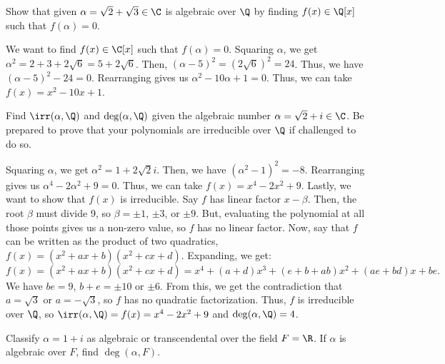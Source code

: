 
\begin{problem}[39.2]
  Show that given $\alpha = \sqrt{2} + \sqrt{3} \in \C$ is algebraic over $\Q$ by finding $f(x) \in \Q[x]$ such that $f(\alpha) = 0$.
\end{problem}

\begin{solution}
  We want to find $f(x) \in \C[x]$ such that $f(\alpha) = 0$. Squaring $\alpha$, we get $\alpha^2 = 2 + 3 + 2\sqrt{6} = 5 + 2\sqrt{6}$. Then, $(\alpha - 5)^2 = (2\sqrt{6})^2 = 24$. Thus, we have $(\alpha - 5)^2 - 24 = 0$. Rearranging gives us $\alpha^2 - 10\alpha + 1 = 0$. Thus, we can take $f(x) = x^2 - 10x + 1$.
\end{solution}

\begin{problem}[39.8]
  Find $\irr(\alpha, \Q)$ and $\deg(\alpha, \Q)$ given the algebraic number $\alpha = \sqrt{2} + i \in \C$. Be prepared to prove that your polynomials are irreducible over $\Q$ if challenged to do so.
\end{problem}

\begin{solution}
  Squaring $\alpha$, we get $\alpha^2 = 1 + 2\sqrt{2}i$. Then, we have $(\alpha^2 - 1)^2 = -8$. Rearranging gives us $\alpha^4 - 2\alpha^2 + 9 = 0$. Thus, we can take $f(x) = x^4 - 2x^2 + 9$. Lastly, we want to show that $f(x)$ is irreducible. Say $f$ has linear factor $x - \beta$. Then, the root $\beta$ must divide 9, so $\beta = \pm 1$, $\pm 3$, or $\pm 9$. But, evaluating the polynomial at all those points gives us a non-zero value, so $f$ has no linear factor. Now, say that $f$ can be written as the product of two quadratics, $f(x) = (x^2 + ax + b)(x^2 + cx + d)$. Expanding, we get:
  \[%
    f(x) = (x^2 + ax + b)(x^2 + cx + d) = x^4 + (a + d)x^3 + (e + b + ab)x^2 + (ae + bd)x + be
  .\]%
  We have $be = 9$, $b + e = \pm 10$ or $\pm 6$. From this, we get the contradiction that $a = \sqrt{3}$ or $a = -\sqrt{3}$, so $f$ has no quadratic factorization. Thus, $f$ is irreducible over $\Q$, so $\irr(\alpha, \Q) = f(x) = x^4 - 2x^2 + 9$ and $\deg(\alpha, \Q) = 4$.
\end{solution}

\begin{problem}[39.10]
  Classify $\alpha = 1 + i$ as algebraic or transcendental over the field $F = \R$. If $\alpha$ is algebraic over $F$, find $\deg(\alpha, F)$.
\end{problem}

